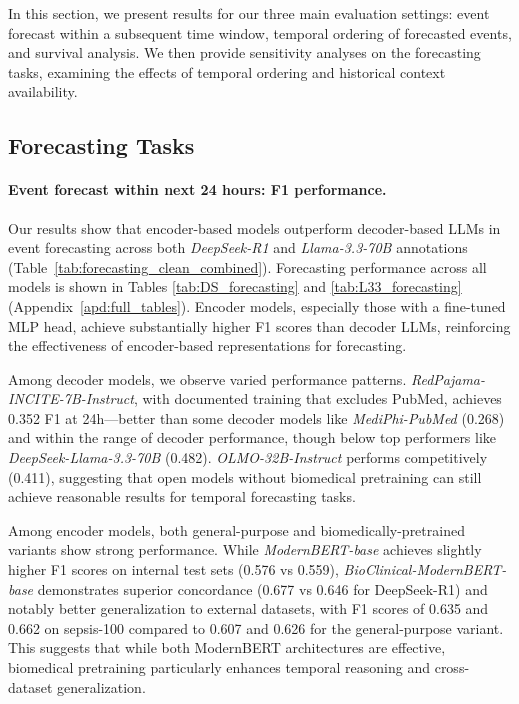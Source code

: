 
% 

In this section, we present results for our three main evaluation settings: event forecast within a subsequent time window, temporal ordering of forecasted events, and survival analysis. We then provide sensitivity analyses on the forecasting tasks, examining the effects of temporal ordering and historical context availability.

\subsection{Forecasting Tasks}

\paragraph{Event forecast within next 24 hours: F1 performance.}

Our results show that encoder-based models outperform decoder-based LLMs in event forecasting across both \textit{DeepSeek-R1} and \textit{Llama-3.3-70B} annotations (Table~\ref{tab:forecasting_clean_combined}).
Forecasting performance across all models is shown in Tables \ref{tab:DS_forecasting} and \ref{tab:L33_forecasting} (Appendix~\ref{apd:full_tables}).
Encoder models, especially those with a fine-tuned MLP head, achieve substantially higher F1 scores than decoder LLMs, reinforcing the effectiveness of encoder-based representations for forecasting.

%
% 
Among decoder models, we observe varied performance patterns. \textit{RedPajama-INCITE-7B-Instruct}, with documented training that excludes PubMed, achieves 0.352 F1 at 24h---better than some decoder models like \textit{MediPhi-PubMed} (0.268) and within the range of decoder performance, though below top performers like \textit{DeepSeek-Llama-3.3-70B} (0.482). \textit{OLMO-32B-Instruct} performs competitively (0.411), suggesting that open models without biomedical pretraining can still achieve reasonable results for temporal forecasting tasks.

Among encoder models, both general-purpose and biomedically-pretrained variants show strong performance. While \textit{ModernBERT-base} achieves slightly higher F1 scores on internal test sets (0.576 vs 0.559), \textit{BioClinical-ModernBERT-base} demonstrates superior concordance (0.677 vs 0.646 for DeepSeek-R1) and notably better generalization to external datasets, with F1 scores of 0.635 and 0.662 on sepsis-100 compared to 0.607 and 0.626 for the general-purpose variant. This suggests that while both ModernBERT architectures are effective, biomedical pretraining particularly enhances temporal reasoning and cross-dataset generalization.

